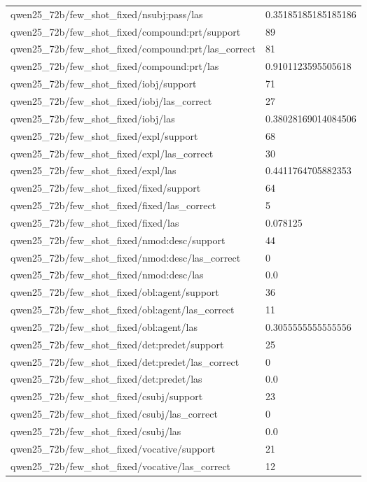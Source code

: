 \begin{tabular}{ll}
qwen25\_72b/few\_shot\_fixed/nsubj:pass/las & 0.35185185185185186 \\
qwen25\_72b/few\_shot\_fixed/compound:prt/support & 89 \\
qwen25\_72b/few\_shot\_fixed/compound:prt/las\_correct & 81 \\
qwen25\_72b/few\_shot\_fixed/compound:prt/las & 0.9101123595505618 \\
qwen25\_72b/few\_shot\_fixed/iobj/support & 71 \\
qwen25\_72b/few\_shot\_fixed/iobj/las\_correct & 27 \\
qwen25\_72b/few\_shot\_fixed/iobj/las & 0.38028169014084506 \\
qwen25\_72b/few\_shot\_fixed/expl/support & 68 \\
qwen25\_72b/few\_shot\_fixed/expl/las\_correct & 30 \\
qwen25\_72b/few\_shot\_fixed/expl/las & 0.4411764705882353 \\
qwen25\_72b/few\_shot\_fixed/fixed/support & 64 \\
qwen25\_72b/few\_shot\_fixed/fixed/las\_correct & 5 \\
qwen25\_72b/few\_shot\_fixed/fixed/las & 0.078125 \\
qwen25\_72b/few\_shot\_fixed/nmod:desc/support & 44 \\
qwen25\_72b/few\_shot\_fixed/nmod:desc/las\_correct & 0 \\
qwen25\_72b/few\_shot\_fixed/nmod:desc/las & 0.0 \\
qwen25\_72b/few\_shot\_fixed/obl:agent/support & 36 \\
qwen25\_72b/few\_shot\_fixed/obl:agent/las\_correct & 11 \\
qwen25\_72b/few\_shot\_fixed/obl:agent/las & 0.3055555555555556 \\
qwen25\_72b/few\_shot\_fixed/det:predet/support & 25 \\
qwen25\_72b/few\_shot\_fixed/det:predet/las\_correct & 0 \\
qwen25\_72b/few\_shot\_fixed/det:predet/las & 0.0 \\
qwen25\_72b/few\_shot\_fixed/csubj/support & 23 \\
qwen25\_72b/few\_shot\_fixed/csubj/las\_correct & 0 \\
qwen25\_72b/few\_shot\_fixed/csubj/las & 0.0 \\
qwen25\_72b/few\_shot\_fixed/vocative/support & 21 \\
qwen25\_72b/few\_shot\_fixed/vocative/las\_correct & 12 \\

\end{tabular}
